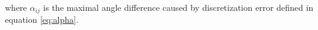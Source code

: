 where $\alpha_{ij}$ is the maximal angle difference caused by discretization error defined in equation \ref{eq:alpha}.








































%

